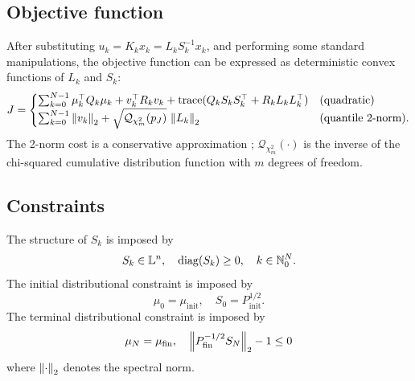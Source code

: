 \documentclass{IEEEtran}
\begin{document}
\subsection{Objective function}
After substituting \( u_k = K_k x_k = L_k S_k^{-1} x_k \), and performing some standard manipulations, the objective function can be expressed as deterministic convex functions of \( L_k \) and \( S_k \):
\begin{equation} \label{eq:objective_deterministic}
	J = \begin{cases}
	\sum_{k=0}^{N-1} \mu_k^\top Q_k \mu_k + v_k^\top R_k v_k + \mathrm{trace} (Q_k S_k S_k^\top + R_k L_k L_k^\top) & \text{(quadratic)} \\
	\sum_{k=0}^{N-1} \norm{v_k}_2 + \sqrt{\mathcal{Q}_{\chi^2_m}(p_J)} \ \norm{L_k}_2 & \text{(quantile 2-norm)}.
	\end{cases}
\end{equation}
The 2-norm cost is a conservative approximation \cite{oguriChanceConstrainedControlSafe2024a}; \( \mathcal{Q}_{\chi^2_m}(\cdot) \) is the inverse of the chi-squared cumulative distribution function with \( m \) degrees of freedom.
\subsection{Constraints}

The structure of \(S_k\) is imposed by
\begin{equation} \label{eq:S_structure_constraint}
	S_k \in \mathbb{L}^n, \quad \mathrm{diag}(S_k) \geq 0, \quad k \in \mathbb{N}_{0}^{N}.
\end{equation}
The initial distributional constraint is imposed by
\begin{equation} \label{eq:initial_distributional_constraint}
	\mu_0 = \mu_{\mathrm{init}}, \quad S_0 = P_{\mathrm{init}}^{1/2}.
\end{equation}
The terminal distributional constraint is imposed by \cite{okamotoOptimalCovarianceControl2018}
\begin{equation} \label{eq:terminal_distributional_constraint}
	\mu_N = \mu_{\mathrm{fin}}, \quad \norm{P_{\mathrm{fin}}^{-1/2} S_N}_2 - 1 \leq 0
\end{equation}
where \( \norm{\cdot}_2 \) denotes the spectral norm.
\end{document}
